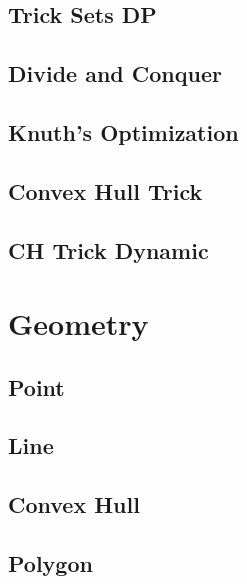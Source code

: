 \subsection{Trick Sets DP}
\raggedbottom
\hrulefill
\subsection{Divide and Conquer}
\raggedbottom
\hrulefill
\subsection{Knuth's Optimization}
\raggedbottom
\hrulefill
\subsection{Convex Hull Trick}
\raggedbottom
\hrulefill
\subsection{CH Trick Dynamic}
\raggedbottom
\hrulefill

\section{Geometry}
\subsection{Point}
\raggedbottom
\hrulefill
\subsection{Line}
\raggedbottom
\hrulefill
\subsection{Convex Hull}
\raggedbottom
\hrulefill
\subsection{Polygon}
\raggedbottom
\hrulefill
